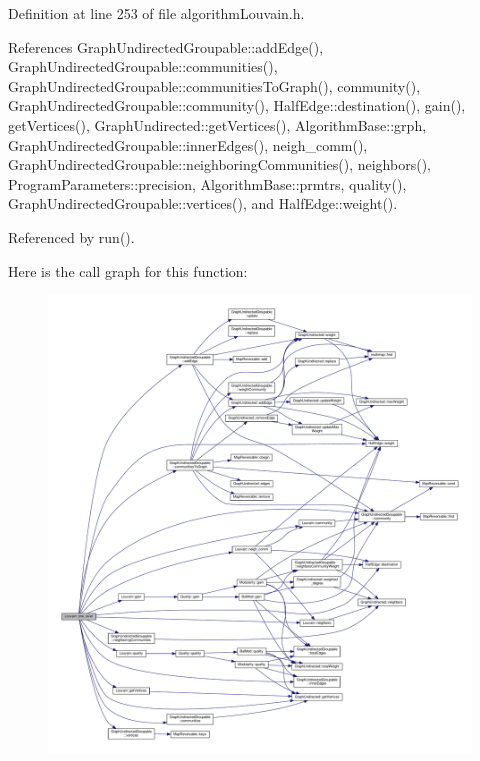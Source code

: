 Definition at line 253 of file algorithm\+Louvain.\+h.



References Graph\+Undirected\+Groupable\+::add\+Edge(), Graph\+Undirected\+Groupable\+::communities(), Graph\+Undirected\+Groupable\+::communities\+To\+Graph(), community(), Graph\+Undirected\+Groupable\+::community(), Half\+Edge\+::destination(), gain(), get\+Vertices(), Graph\+Undirected\+::get\+Vertices(), Algorithm\+Base\+::grph, Graph\+Undirected\+Groupable\+::inner\+Edges(), neigh\+\_\+comm(), Graph\+Undirected\+Groupable\+::neighboring\+Communities(), neighbors(), Program\+Parameters\+::precision, Algorithm\+Base\+::prmtrs, quality(), Graph\+Undirected\+Groupable\+::vertices(), and Half\+Edge\+::weight().



Referenced by run().

Here is the call graph for this function\+:
\nopagebreak
\begin{figure}[H]
\begin{center}
\leavevmode
\includegraphics[width=350pt]{classLouvain_a89a2206f2669b9c0998d23e87ec40fb8_cgraph}
\end{center}
\end{figure}
\mbox{\label{classLouvain_ae328a55f83e485adb14a501bfb704d75}} 
